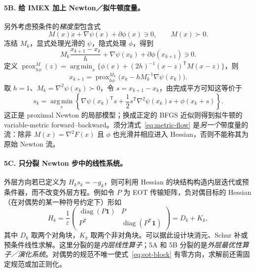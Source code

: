 \documentclass[11pt,a4paper]{ctexart}
\newcommand{\prox}{\operatorname{prox}}
\newcommand{\argmin}{\operatorname*{arg\,min}}
\newcommand{\trans}{\mathsf T}
\begin{document}
\paragraph{5B. 给 IMEX 加上 Newton／拟牛顿度量。}
另外考虑预条件的\emph{梯度型}包含式
\begin{equation}\label{eq:metric-flow}
M(x)\dot x+\nabla\psi(x)+\partial\phi(x)\ni0,
\qquad M(x)\succ0.
\end{equation}
冻结 $M_k$，显式处理光滑的 $\psi$，隐式处理 $\phi$，得到
\begin{equation}\label{eq:metric-imex}
M_k\frac{x_{k+1}-x_k}{h}+\nabla\psi(x_k)+\partial\phi(x_{k+1})\ni0.
\end{equation}
定义 $\prox^{M}_{h\phi}(z)=\argmin_x\{\phi(x)+(2h)^{-1}(x-z)^{\trans}M(x-z)\}$，则
\begin{equation}\label{eq:metric-prox}
x_{k+1}=\prox^{M_k}_{h\phi}
\bigl(x_k-hM_k^{-1}\nabla\psi(x_k)\bigr).
\end{equation}
取 $h=1$、$M_k=\nabla^2\psi(x_k)\succ0$，令 $s=x_{k+1}-x_k$，由完成平方可知这等价于
\begin{equation}\label{eq:prox-newton}
s_k=\argmin_s\left\{\nabla\psi(x_k)^{\trans}s
+\frac12s^{\trans}\nabla^2\psi(x_k)s+\phi(x_k+s)\right\}.
\end{equation}
这正是 proximal Newton 的局部模型；换成正定的 BFGS 近似则得到拟牛顿的 variable-metric forward--backward。须分清式~\eqref{eq:metric-flow} 是\emph{另一个}带度量的流：除非 $M(x)=\nabla^2F(x)$ 且 $\phi$ 也光滑并相应进入 Hessian，否则不能称其为原始 Newton 流。

\paragraph{5C. 只分裂 Newton 步中的线性系统。}
外层方向若已定义为 $H_ks_k=-g_k$，则可利用 Hessian 的块结构构造内层迭代或预条件器，而不改变外层方程。例如令 $P$ 为 EOT 传输矩阵，负对偶目标的 Hessian（在对偶势的某一种符号约定下）形如
\begin{equation}\label{eq:eot-block}
H_k=\frac1\varepsilon
\begin{pmatrix}
\operatorname{diag}(P\bm1)&P\\
P^{\trans}&\operatorname{diag}(P^{\trans}\bm1)
\end{pmatrix}
=D_k+K_k,
\end{equation}
其中 $D_k$ 取两个对角块，$K_k$ 取两个非对角块。可以据此设计块消元、Schur 补或预条件线性求解。这里分裂的是\emph{内层线性算子}；5A 和 5B 分裂的是\emph{外层最优性算子／演化系统}。对偶势的规范不唯一使式~\eqref{eq:eot-block} 有零方向，求解前还需固定规范或加正则化。
\end{document}
